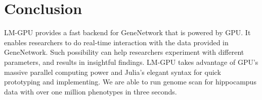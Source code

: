 \documentclass[9pt,twocolumn,twoside,lineno]{gsag3jnl}
\begin{document}
\section{Conclusion}

LM-GPU provides a fast backend for GeneNetwork that is powered by GPU. 
It enables researchers to do real-time interaction with the data provided in GeneNetwork. 
Such possibility can help researchers experiment with different parameters, and results in insightful findings. 
LM-GPU takes advantage of GPU's massive parallel computing power and Julia's elegant syntax for quick prototyping and implementing. 
We are able to run genome scan for hippocampus data with over one million phenotypes in three seconds. 








\end{document}
